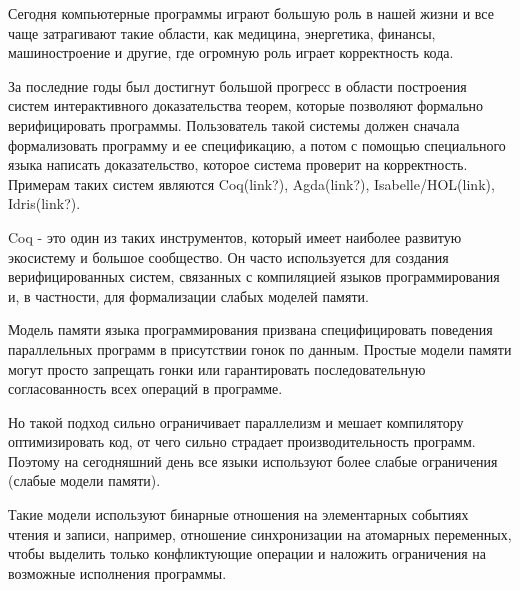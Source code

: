 \documentclass[times
              ]{itmo-student-thesis}
\begin{document}

\tableofcontents

\startprefacepage



\startrelatedwork
Сегодня компьютерные программы играют большую роль в нашей жизни и все чаще затрагивают такие области, как медицина, энергетика, финансы, машиностроение и другие, где огромную роль играет корректность кода.

За последние годы был достигнут большой прогресс в области построения систем интерактивного доказательства теорем, которые позволяют формально верифицировать программы.
Пользователь такой системы должен сначала формализовать программу и ее спецификацию, а потом с помощью специального языка написать доказательство, которое система проверит на корректность.
Примерам таких систем являются Coq(link?), Agda(link?), Isabelle/HOL(link), Idris(link?).

Coq - это один из таких инструментов, который имеет наиболее развитую экосистему и большое сообщество.
Он часто используется для создания верифицированных систем, связанных с компиляцией языков программирования\cite{comp-cert, vellvm} и, в частности, для формализации слабых моделей памяти\cite{rc11, imm}.

Модель памяти языка программирования призвана специфицировать поведения параллельных программ в присутствии гонок по данным.
Простые модели памяти могут просто запрещать гонки или гарантировать последовательную согласованность всех операций в программе.

Но такой подход сильно ограничивает параллелизм и мешает компилятору оптимизировать код, от чего сильно страдает производительность программ.
Поэтому на сегодняшний день все языки используют более слабые ограничения (слабые модели памяти).

Такие модели используют бинарные отношения на элементарных событиях чтения и записи, например, отношение синхронизации на атомарных переменных, чтобы выделить только конфликтующие операции и наложить ограничения на возможные исполнения программы.
\end{document}
